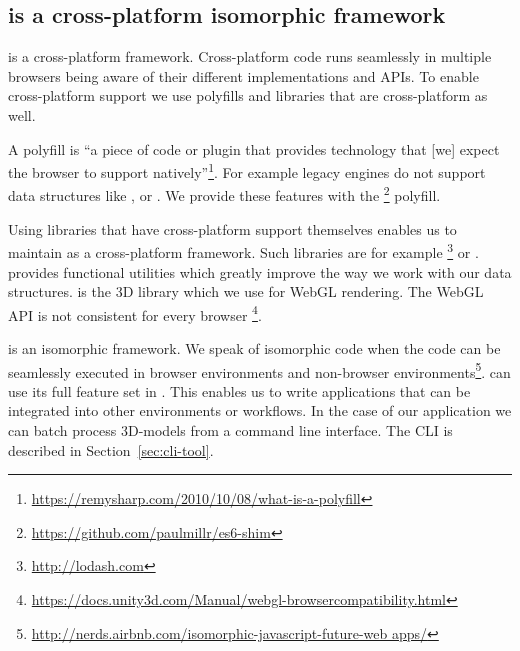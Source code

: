 \documentclass[../../ClassicThesis.tex]{subfiles}
\begin{document}


\subsection{{\convertify} is a cross-platform isomorphic framework}
\label{sec:convertify-is-isomorphic}

{\convertify} is a cross-platform framework. Cross-platform
{\javascript} code runs seamlessly in multiple browsers
being aware of their different implementations and APIs.
To enable cross-platform {\javascript} support we use
polyfills and libraries that are cross-platform as well.

A polyfill is \enquote{a piece of code or plugin that
  provides technology that [we] expect the browser to
  support
  natively}\footnote{\url{https://remysharp.com/2010/10/08/what-is-a-polyfill}}.
For example legacy {\javascript} engines do not support data
structures like ,  or
. We provide these features with the
\footnote{\url{https://github.com/paulmillr/es6-shim}}
polyfill.

Using libraries that have cross-platform support themselves enables us
to maintain {\convertify} as a cross-platform framework. Such
libraries are for example
\footnote{\url{http://lodash.com}} or {\threejs}.
 provides functional utilities which greatly improve the
way we work with our data structures. {\threejs} is the 3D library
which we use for WebGL rendering. The WebGL API is not consistent for every browser
\footnote{\url{https://docs.unity3d.com/Manual/webgl-browsercompatibility.html}}.


{\convertify} is an isomorphic framework. We speak of
isomorphic {\javascript} code when the code can be
seamlessly executed in browser environments and non-browser
environments\footnote{\url{http://nerds.airbnb.com/isomorphic-javascript-future-web
    apps/}}.
{\convertify} can use its full feature set in {\nodejs}.
This enables us to write applications that can be integrated
into other environments or workflows. In the case of our
application {\platener} we can batch process 3D-models from
a command line interface. The CLI is described in
Section~\ref{sec:cli-tool}.
\end{document}

